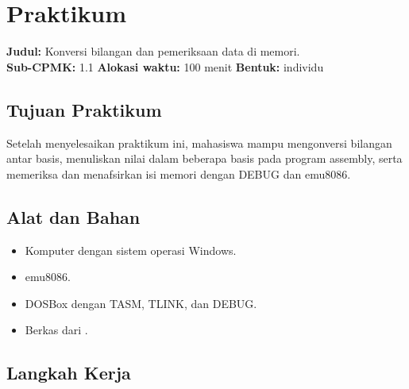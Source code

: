 \section{Praktikum}
\label{sec:praktikum-bab3}

\begin{praktikumbox}
\vspace{1.1em}
\textbf{Judul:} Konversi bilangan dan pemeriksaan data di memori.\\[0.3em]
\textbf{Sub-CPMK:} 1.1 \quad\textbullet\quad
\textbf{Alokasi waktu:} 100 menit \quad\textbullet\quad
\textbf{Bentuk:} individu
\end{praktikumbox}

\subsection{Tujuan Praktikum}

Setelah menyelesaikan praktikum ini, mahasiswa mampu mengonversi
bilangan antar basis, menuliskan nilai dalam beberapa basis pada
program assembly, serta memeriksa dan menafsirkan isi memori dengan
DEBUG dan emu8086.

\subsection{Alat dan Bahan}

\begin{itemize}
    \item Komputer dengan sistem operasi Windows.
    \item emu8086.
    \item DOSBox dengan TASM, TLINK, dan DEBUG.
    \item Berkas  dari .
\end{itemize}

\subsection{Langkah Kerja}

